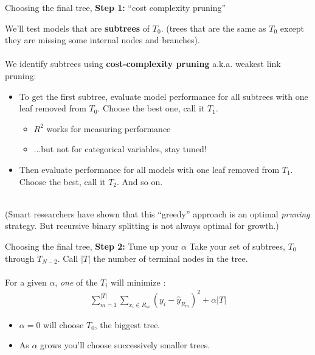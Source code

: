 \documentclass[mathserif, aspectratio=169]{beamer}
\begin{document}
\begin{frame}{Choosing the final tree, \textbf{Step 1: } ``cost complexity pruning''}

We'll test models that are \textbf{subtrees} of $T_0$. (trees that are the same as $T_0$ except they are missing some internal nodes and branches).\\~\\

We identify subtrees using \textbf{cost-complexity pruning} a.k.a. weakest link pruning:
\vspace{4mm}
\begin{itemize}
\item To get the first subtree, evaluate model performance for all subtrees with one leaf removed from $T_0$.  Choose the best one, call it $T_1$.  
\begin{itemize}
\item $R^2$ works for measuring performance
\item ...but not for categorical variables, stay tuned!
\end{itemize}
\vspace{4mm}
\item Then evaluate performance for all models with one leaf removed from $T_1$.  Choose the best, call it $T_2$.  And so on.  \\~\\
\end{itemize}

\pause

(Smart researchers have shown that this ``greedy'' approach is an optimal \textit{pruning} strategy.  But recursive binary splitting is not always optimal for growth.)

\end{frame}

\begin{frame}{Choosing the final tree, \textbf{Step 2: } Tune up your $\alpha$}
Take your set of subtrees, $T_0$ through $T_{N-2}$.  Call $|T|$ the number of terminal nodes in the tree.\\~\\

For a given $\alpha$, \textit{one} of the $T_i$ will minimize :
\begin{align*}
\sum_{m=1}^{|T|} \sum_{x_i\in R_m} (y_i-\hat{y}_{R_m})^2+\alpha|T|
\end{align*}

\begin{itemize}
\item $\alpha=0$ will choose $T_0$, the biggest tree.
\item As $\alpha$ grows you'll choose successively smaller trees.  \\~\\
\end{itemize}

\end{frame}
\end{document}
